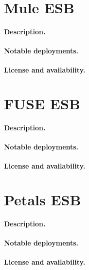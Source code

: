\documentclass[a4paper]{report}
\begin{document}
\section{Mule ESB}

\paragraph{Description.}

\paragraph{Notable deployments.}

\paragraph{License and availability.}


\section{FUSE ESB}

\paragraph{Description.}

\paragraph{Notable deployments.}

\paragraph{License and availability.}



\section{Petals ESB}

\paragraph{Description.}

\paragraph{Notable deployments.}

\paragraph{License and availability.}
\end{document}
